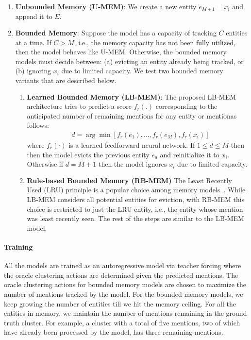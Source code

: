 \documentclass[12pt]{thesis-umich}[thesis]
\newcommand{\unbounded}{U-MEM\xspace}
\newcommand{\learned}{LB-MEM\xspace}
\newcommand{\lru}{RB-MEM\xspace}
\begin{document}
\begin{enumerate}\item \textbf{Unbounded Memory (\unbounded)}: We create a new entity $e_{M + 1} = x_i$ and append it to $E$.
    

    \item \textbf{Bounded Memory}: Suppose the model has a capacity of tracking $C$ entities at a time.
    If $C > M$, i.e., the memory capacity has not been fully utilized, then the model behaves like U-MEM. Otherwise, the bounded memory models must decide between: (a) evicting an entity already being tracked, or (b) ignoring $x_i$ due to limited capacity. We test two bounded memory variants that are described below.

    \begin{enumerate}\item \textbf{Learned Bounded Memory (\learned)}:
        The proposed \learned architecture tries to predict a score $f_r(.)$ corresponding to the anticipated number of remaining mentions for any entity or mentionas follows:
        \begin{align*}
            &d = \arg\min [f_r(e_1), \dotsc, f_r(e_M), f_r(x_i)]
        \end{align*}
        where $f_r(\cdot)$ is a learned feedforward neural network. If $1 \le d \le M$ then then the model evicts the previous entity $e_d$ and reinitialize it to $x_i$.
        Otherwise if $d = M + 1$ then the model ignores $x_i$ due to limited capacity.
        \item \textbf{Rule-based Bounded Memory (\lru)}
        The Least Recently Used (LRU) principle is a popular choice among memory models~\citep{rae2016scaling, santoro2016one}.
        While \learned  considers all potential entities for eviction, with \lru  this choice is restricted to just the LRU entity, i.e., the entity whose mention was least recently seen.
        The rest of the steps are similar to the \learned model.
    \end{enumerate}
\end{enumerate}



\paragraph{Training}
All the models are trained as an autoregressive model via teacher forcing where the oracle clustering actions are determined given the predicted mentions.
The oracle clustering actions for bounded memory models are chosen to maximize the number of mentions tracked by the model. For the bounded memory models, we keep growing the number of entities till we hit the memory ceiling.
For all the entities in memory, we maintain the number of mentions remaining in the ground truth cluster.
For example, a cluster with a total of five mentions, two of which have already been processed by the model, has three remaining mentions.
\end{document}
